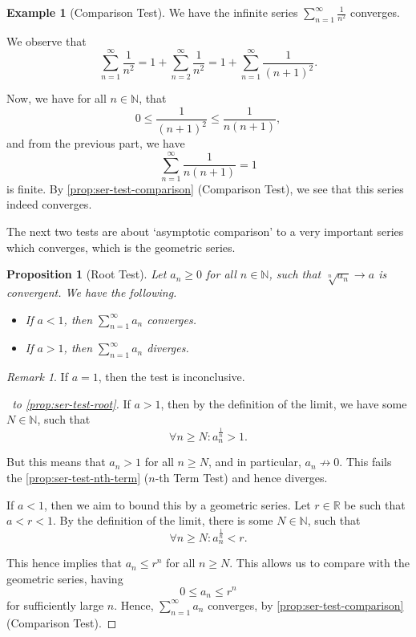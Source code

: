 \documentclass[11pt]{article}
\numberwithin{equation}{section}
\newtheorem{proposition}[theorem]{Proposition}
\theoremstyle{definition}
\newtheorem{example}[theorem]{Example}
\theoremstyle{remark}
\newtheorem{remark}[theorem]{Remark}
\newcommand{\pqty}[1]{\left(#1\right)}
\newcommand{\RR}{\mathbb R}
\newcommand{\NN}{\mathbb N}
\newcommand{\notto}{\not\to}
\begin{document}
\begin{example}[Comparison Test]\label{analysis-unit-0039}
    \label{ex:ser-test-comparison}%
    We have the infinite series \(\sum_{n = 1}^{\infty} \frac{1}{n^2}\) converges.

    We observe that
    \[
        \sum_{n = 1}^{\infty} \frac{1}{n^2} = 1 + \sum_{n = 2}^{\infty} \frac{1}{n^2} = 1 + \sum_{n = 1}^{\infty} \frac{1}{\pqty{n + 1}^2}.
    \]

    Now, we have for all \(n \in \NN\), that
    \[
        0 \leq \frac{1}{\pqty{n + 1}^2} \leq \frac{1}{n \pqty{n + 1}},
    \]
    and from the previous part, we have
    \[
        \sum_{n = 1}^{\infty} \frac{1}{n\pqty{n + 1}} = 1
    \]
    is finite. By \autoref{prop:ser-test-comparison} (Comparison Test), we see that this series indeed converges.
\end{example}

The next two tests are about `asymptotic comparison' to a very important series which converges, which is the geometric series.

\begin{proposition}[Root Test]\label{analysis-unit-0040}
    \label{prop:ser-test-root}%
    Let \(a_n \geq 0\) for all \(n \in \NN\), such that \(\sqrt[n]{a_n} \to a\) is convergent. We have the following.

    \begin{itemize}
        \item If \(a < 1\), then \(\sum_{n = 1}^{\infty} a_n\) converges.
        \item If \(a > 1\), then \(\sum_{n = 1}^{\infty} a_n\) diverges.
    \end{itemize}
\end{proposition}

\begin{remark}\label{analysis-unit-0041}
    If \(a = 1\), then the test is inconclusive.
\end{remark}

\begin{proof}[\proofname\ to \autoref{prop:ser-test-root}]
    If \(a > 1\), then by the definition of the limit, we have some \(N \in \NN\), such that
    \[
        \forall n \geq N: a_n^{\frac{1}{n}} > 1.
    \]

    But this means that \(a_n > 1\) for all \(n \geq N\), and in particular, \(a_n \notto 0\). This fails the \autoref{prop:ser-test-nth-term} (\(n\)-th Term Test) and hence diverges.

    If \(a < 1\), then we aim to bound this by a geometric series. Let \(r \in \RR\) be such that \(a < r < 1\). By the definition of the limit, there is some \(N \in \NN\), such that
    \[
        \forall n \geq N: a_n^{\frac{1}{n}} < r.
    \]

    This hence implies that \(a_n \leq r^n\) for all \(n \geq N\). This allows us to compare with the geometric series, having
    \[
        0 \leq a_n \leq r^n
    \]
    for sufficiently large \(n\). Hence, \(\sum_{n = 1}^{\infty} a_n\) converges, by \autoref{prop:ser-test-comparison} (Comparison Test).
\end{proof}
\end{document}
